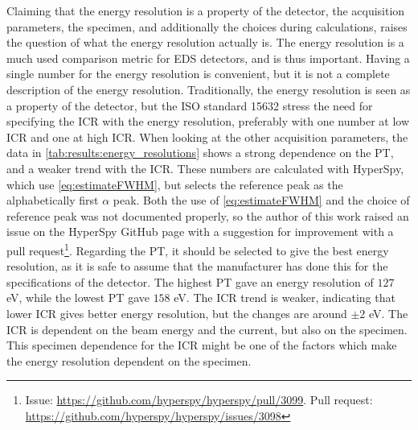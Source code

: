 Claiming that the energy resolution is a property of the detector, the acquisition parameters, the specimen, and additionally the choices during calculations, raises the question of what the energy resolution actually is.
The energy resolution is a much used comparison metric for EDS detectors, and is thus important.
Having a single number for the energy resolution is convenient, but it is not a complete description of the energy resolution.
Traditionally, the energy resolution is seen as a property of the detector, but the ISO standard 15632 \cite{iso_qc_15632} stress the need for specifying the ICR with the energy resolution, preferably with one number at low ICR and one at high ICR.
When looking at the other acquisition parameters, the data in \cref{tab:results:energy_resolutions} shows a strong dependence on the PT, and a weaker trend with the ICR.
These numbers are calculated with HyperSpy, which use \cref{eq:estimateFWHM}, but selects the reference peak as the alphabetically first $\alpha$ peak.
Both the use of \cref{eq:estimateFWHM} and the choice of reference peak was not documented properly, so the author of this work raised an issue on the HyperSpy GitHub page with a suggestion for improvement with a pull request\footnote{Issue: \url{https://github.com/hyperspy/hyperspy/pull/3099}. Pull request: \url{https://github.com/hyperspy/hyperspy/issues/3098}}.
Regarding the PT, it should be selected to give the best energy resolution, as it is safe to assume that the manufacturer has done this for the specifications of the detector.
The highest PT gave an energy resolution of $127$ eV, while the lowest PT gave $158$ eV.
The ICR trend is weaker, indicating that lower ICR gives better energy resolution, but the changes are around $\pm 2$ eV.
The ICR is dependent on the beam energy and the current, but also on the specimen.
This specimen dependence for the ICR might be one of the factors which make the energy resolution dependent on the specimen.


